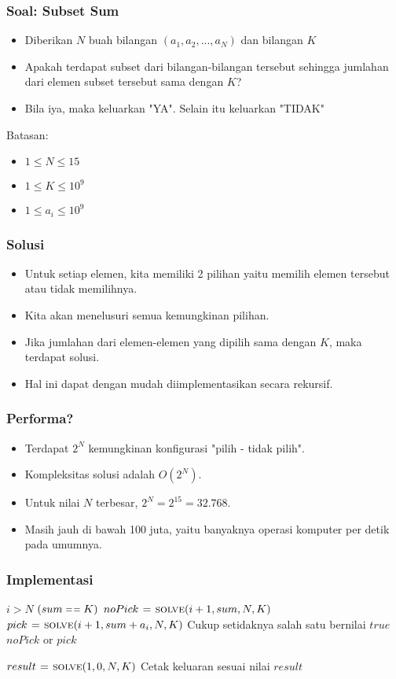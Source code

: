 \begin{frame}
\frametitle{Soal: Subset Sum}
\begin{itemize}
  \item Diberikan $N$ buah bilangan $(a_1, a_2, ..., a_N)$ dan bilangan $K$
  \item Apakah terdapat subset dari bilangan-bilangan tersebut sehingga jumlahan dari elemen subset tersebut sama dengan $K$? 
  \item Bila iya, maka keluarkan "YA". Selain itu keluarkan "TIDAK"
\end{itemize}

Batasan:
\begin{itemize} 
  \item $1 \leq N \leq 15$
  \item $1 \leq K \leq 10^9$
  \item $1 \leq a_i \leq 10^9$
\end{itemize}
\end{frame}

\begin{frame}
\frametitle{Solusi}
\begin{itemize}
  \item Untuk setiap elemen, kita memiliki 2 pilihan yaitu memilih elemen tersebut atau tidak memilihnya.
  \item Kita akan menelusuri semua kemungkinan pilihan.
  \item Jika jumlahan dari elemen-elemen yang dipilih sama dengan $K$, maka terdapat solusi.
  \item Hal ini dapat dengan mudah diimplementasikan secara rekursif.
\end{itemize}
\end{frame}

\begin{frame}
\frametitle{Performa?}
\begin{itemize}
  \item Terdapat $2^N$ kemungkinan konfigurasi "pilih - tidak pilih".
  \item Kompleksitas solusi adalah $O(2^N)$.
  \item Untuk nilai $N$ terbesar, $2^N = 2^{15} = 32.768$.
  \item Masih jauh di bawah 100 juta, yaitu banyaknya operasi komputer per detik pada umumnya.
\end{itemize}
\end{frame}

\begin{frame}
\frametitle{Implementasi}
\begin{codebox}
\li \If $i > N$ \Then
\li   \Return $(sum \isequal K)$
\li \Else 
\li   $noPick \mathrel{\hspace{1pt}=\hspace{1pt}} \textnormal{\scshape solve}(i+1, sum, N, K)$
\li   $pick \mathrel{\hspace{1pt}=\hspace{1pt}} \textnormal{\scshape solve}(i+1, sum + a_i, N, K)$
\li   \Comment Cukup setidaknya salah satu bernilai $true$
\li   \Return $noPick$ or $pick$
    \End
\end{codebox}

\begin{codebox}
\li $result \mathrel{\hspace{1pt}=\hspace{1pt}} \textnormal{\scshape solve}(1, 0, N, K)$
\li \Comment Cetak keluaran sesuai nilai $result$
\end{codebox}
\end{frame}

